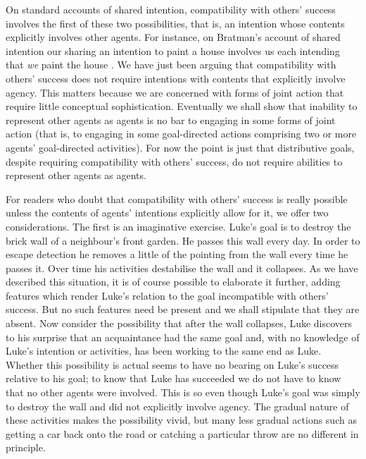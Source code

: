 \documentclass[12pt,a4paper]{extarticle}
\begin{document}
On standard accounts of shared intention, compatibility with others' success involves the first of these two possibilities, that is, an intention whose contents  explicitly involves other agents.  
For instance, on Bratman's account of shared intention our sharing an intention to paint a house involves us each intending that \emph{we} paint the house \citep[p.\ 333]{Bratman:1992mi}.
We have just been arguing that compatibility with  others' success does not require intentions with contents that explicitly involve agency.
This matters because we are concerned with  forms of joint action that require little conceptual sophistication.  
Eventually we shall show that inability to represent other agents as agents is no bar to engaging in some forms of joint action (that is, to engaging in some goal-directed actions comprising two or more agents' goal-directed activities).
For now the point is just that distributive goals, despite requiring compatibility with others' success, do not require abilities to represent other agents as agents.

For readers who doubt that compatibility with others' success is really possible unless the contents of agents' intentions explicitly allow for it, we offer two considerations.
The first is an imaginative exercise.  
Luke's goal is to destroy the brick wall of a neighbour's front garden.  
He passes this wall every day.  
In order to escape detection he removes a little of the pointing from the wall every time he passes it.  
Over time his activities destabilise the wall and it collapses.  
As we have described this situation, it is of course possible to elaborate it further, adding features which render Luke's relation to the goal incompatible with others' success.
But no such features need be present and we shall stipulate that they are absent.
Now consider the possibility that after the wall collapses, Luke discovers to his surprise that an acquaintance had the same goal and, with no knowledge of Luke's intention or activities, has been working to the same end as Luke.
Whether this possibility is actual seems to have no bearing on Luke's success relative to his goal; to know that Luke has succeeded we do not have to know that no other agents were involved.
This is so even though Luke's goal was simply to destroy the wall and did not explicitly involve agency.
The gradual nature of these activities makes the possibility vivid, but many less gradual actions such as getting a car back onto the road or catching a particular throw are no different in principle.
\end{document}
